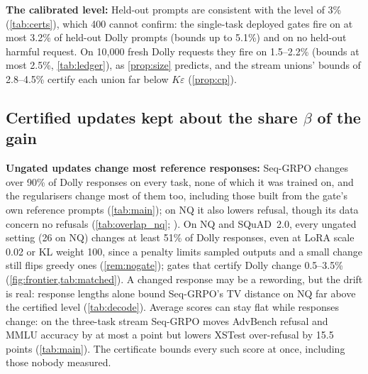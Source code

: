 \documentclass{article}
\theoremstyle{plain}
\theoremstyle{definition}
\theoremstyle{remark}
\begin{document}
\textbf{The calibrated level:} Held-out prompts are consistent with the level of 3\% (\cref{tab:certs}), which 400 cannot
confirm: the single-task deployed gates fire on at most 3.2\% of held-out Dolly prompts (bounds up to 5.1\%) and on no
held-out harmful request. On 10{,}000 fresh Dolly requests they fire on 1.5--2.2\% (bounds at most 2.5\%,
\cref{tab:ledger}), as \cref{prop:size} predicts, and the stream unions' bounds of 2.8--4.5\% certify each union far
below $K\varepsilon$ (\cref{prop:cp}).

\subsection{Certified updates kept about the share $\beta$ of the gain}
\label{sec:res-switch}\label{sec:res-drift}\label{sec:res-scale}

\textbf{Ungated updates change most reference responses:} Seq-GRPO changes over 90\% of Dolly responses on every
task, none of which it was trained on, and the regularisers change most of them too, including those built from the
gate's own reference prompts (\cref{tab:main}); on NQ it also lowers refusal, though its data concern no refusals (\cref{tab:overlap_nq}; \citealp{qi2024finetuning}). On NQ and SQuAD~2.0, every ungated setting (26 on NQ) changes at
least 51\% of Dolly responses, even at LoRA scale 0.02 or KL weight 100, since a penalty limits sampled outputs and a
small change still flips greedy ones (\cref{rem:nogate}); gates that certify Dolly change 0.5--3.5\%
(\cref{fig:frontier,tab:matched}). A changed response may be a
rewording, but the drift is real: response lengths alone bound Seq-GRPO's TV distance on NQ far above the certified level (\cref{tab:decode}).
Average scores can stay flat while responses change: on the three-task stream Seq-GRPO moves AdvBench refusal and
MMLU accuracy by at most a point but lowers XSTest over-refusal by 15.5 points (\cref{tab:main}). The certificate
bounds every such score at once, including those nobody measured.
\end{document}
